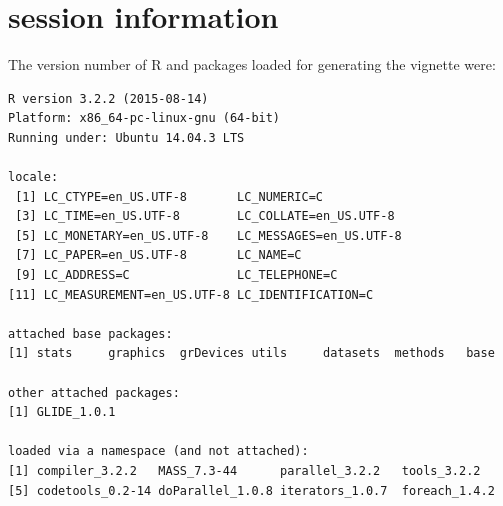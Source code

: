 \documentclass[12pt]{article}
\newcommand{\R}{{\textsf{R}}}
\begin{document}
\section{session information}

The version number of \R{} and packages loaded for generating the vignette were:

\begin{verbatim}
R version 3.2.2 (2015-08-14)
Platform: x86_64-pc-linux-gnu (64-bit)
Running under: Ubuntu 14.04.3 LTS

locale:
 [1] LC_CTYPE=en_US.UTF-8       LC_NUMERIC=C              
 [3] LC_TIME=en_US.UTF-8        LC_COLLATE=en_US.UTF-8    
 [5] LC_MONETARY=en_US.UTF-8    LC_MESSAGES=en_US.UTF-8   
 [7] LC_PAPER=en_US.UTF-8       LC_NAME=C                 
 [9] LC_ADDRESS=C               LC_TELEPHONE=C            
[11] LC_MEASUREMENT=en_US.UTF-8 LC_IDENTIFICATION=C       

attached base packages:
[1] stats     graphics  grDevices utils     datasets  methods   base     

other attached packages:
[1] GLIDE_1.0.1

loaded via a namespace (and not attached):
[1] compiler_3.2.2   MASS_7.3-44      parallel_3.2.2   tools_3.2.2     
[5] codetools_0.2-14 doParallel_1.0.8 iterators_1.0.7  foreach_1.4.2   \end{verbatim}



 
\end{document}
